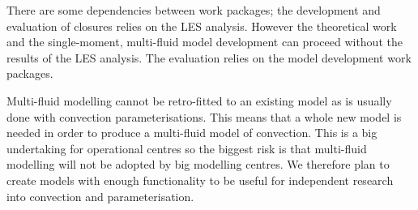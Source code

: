 \documentclass[11pt,a4paper]{article}
\begin{document}
There are some dependencies between work packages; the development and evaluation of closures relies on the LES analysis. However the theoretical work and the single-moment, multi-fluid model development can proceed without the results of the LES analysis. The evaluation relies on the model development work packages.

Multi-fluid modelling cannot be retro-fitted to an existing model as is usually done with convection parameterisations. This means that a whole new model is needed in order to produce a multi-fluid model of convection. This is a big undertaking for operational centres so the biggest risk is that multi-fluid modelling will not be adopted by big modelling centres. We therefore plan to create models with enough functionality to be useful for independent research into convection and parameterisation.

\renewcommand\refname{References (not included in Track Record)}

%

\end{document}
